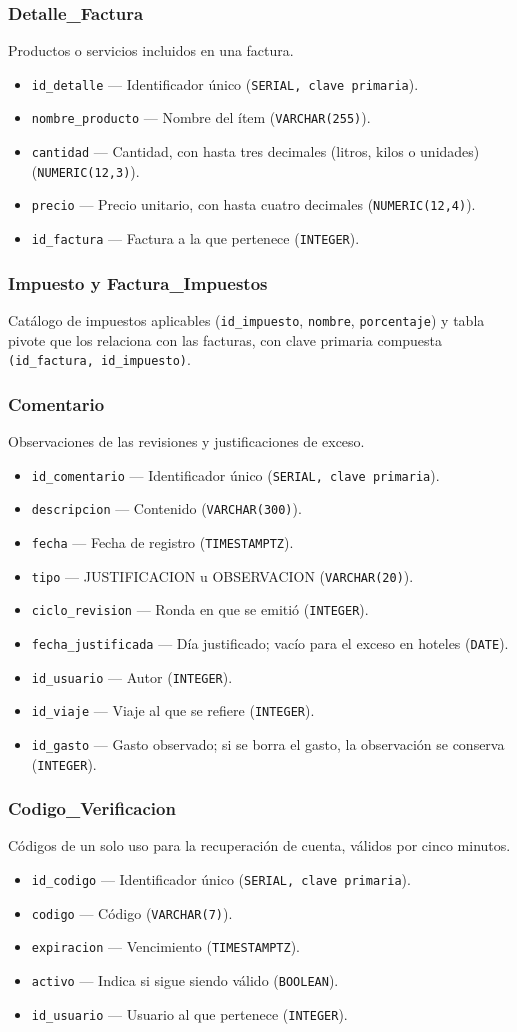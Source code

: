 \documentclass[11pt,letterpaper]{article}
\newcommand{\code}[1]{\nolinkurl{#1}}
\newcommand{\campo}[3]{\item \code{#1} --- #2 (\texttt{#3}).}
\begin{document}
\subsubsection{Detalle\_Factura}
Productos o servicios incluidos en una factura.
\begin{itemize}
  \campo{id_detalle}{Identificador único}{SERIAL, clave primaria}
  \campo{nombre_producto}{Nombre del ítem}{VARCHAR(255)}
  \campo{cantidad}{Cantidad, con hasta tres decimales (litros, kilos o unidades)}{NUMERIC(12,3)}
  \campo{precio}{Precio unitario, con hasta cuatro decimales}{NUMERIC(12,4)}
  \campo{id_factura}{Factura a la que pertenece}{INTEGER}
\end{itemize}

\subsubsection{Impuesto y Factura\_Impuestos}
Catálogo de impuestos aplicables (\code{id_impuesto}, \code{nombre}, \code{porcentaje}) y tabla pivote que los relaciona con las facturas, con clave primaria compuesta \code{(id_factura, id_impuesto)}.

\subsubsection{Comentario}
Observaciones de las revisiones y justificaciones de exceso.
\begin{itemize}
  \campo{id_comentario}{Identificador único}{SERIAL, clave primaria}
  \campo{descripcion}{Contenido}{VARCHAR(300)}
  \campo{fecha}{Fecha de registro}{TIMESTAMPTZ}
  \campo{tipo}{JUSTIFICACION u OBSERVACION}{VARCHAR(20)}
  \campo{ciclo_revision}{Ronda en que se emitió}{INTEGER}
  \campo{fecha_justificada}{Día justificado; vacío para el exceso en hoteles}{DATE}
  \campo{id_usuario}{Autor}{INTEGER}
  \campo{id_viaje}{Viaje al que se refiere}{INTEGER}
  \campo{id_gasto}{Gasto observado; si se borra el gasto, la observación se conserva}{INTEGER}
\end{itemize}

\subsubsection{Codigo\_Verificacion}
Códigos de un solo uso para la recuperación de cuenta, válidos por cinco minutos.
\begin{itemize}
  \campo{id_codigo}{Identificador único}{SERIAL, clave primaria}
  \campo{codigo}{Código}{VARCHAR(7)}
  \campo{expiracion}{Vencimiento}{TIMESTAMPTZ}
  \campo{activo}{Indica si sigue siendo válido}{BOOLEAN}
  \campo{id_usuario}{Usuario al que pertenece}{INTEGER}
\end{itemize}
\end{document}
